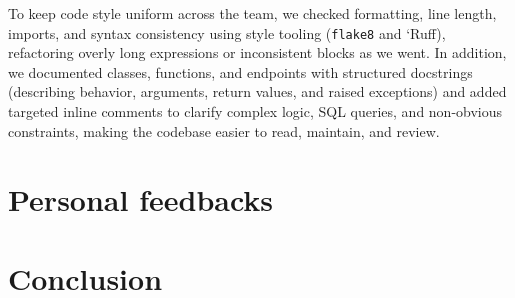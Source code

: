 \documentclass[
  french,
  11pt,
  a4paper,
]{report}
\begin{document}
To keep code style uniform across the team, we checked formatting, line
length, imports, and syntax consistency using style tooling
(\texttt{flake8} and `Ruff), refactoring overly long expressions or
inconsistent blocks as we went. In addition, we documented classes,
functions, and endpoints with structured docstrings (describing
behavior, arguments, return values, and raised exceptions) and added
targeted inline comments to clarify complex logic, SQL queries, and
non-obvious constraints, making the codebase easier to read, maintain,
and review.

\chapter{Personal feedbacks}\label{personal-feedbacks}

\chapter{Conclusion}\label{conclusion}
\end{document}
